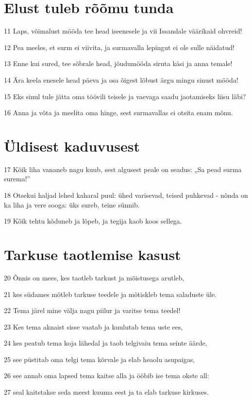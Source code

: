 \section*{Elust tuleb rõõmu tunda}

\par 11 Laps, võimalust mööda tee head iseenesele ja vii Issandale väärikaid ohvreid!
\par 12 Pea meeles, et surm ei viivita, ja surmavalla lepingut ei ole sulle näidatud!
\par 13 Enne kui sured, tee sõbrale head, jõudumööda siruta käsi ja anna temale!
\par 14 Ära keela enesele head päeva ja osa õigest lõbust ärgu mingu sinust mööda!
\par 15 Eks sinul tule jätta oma töövili teisele ja vaevaga saadu jaotamiseks liisu läbi?
\par 16 Anna ja võta ja meelita oma hinge, sest surmavallas ei otsita enam mõnu.

\section*{Üldisest kaduvusest}

\par 17 Kõik liha vananeb nagu kuub, sest algusest peale on seadus: „Sa pead surma surema!”
\par 18 Otsekui haljad lehed kaharal puul: ühed varisevad, teised puhkevad - nõnda on ka liha ja vere sooga: üks sureb, teine sünnib.
\par 19 Kõik tehtu kõduneb ja lõpeb, ja tegija kaob koos sellega.

\section*{Tarkuse taotlemise kasust}

\par 20 Õnnis on mees, kes taotleb tarkust ja mõistusega arutleb,
\par 21 kes südames mõtleb tarkuse teedele ja mõtiskleb tema saladuste üle.
\par 22 Tema järel mine välja nagu piilur ja varitse tema teedel!
\par 23 Kes tema aknaist sisse vaatab ja kuulutab tema uste ees,
\par 24 kes peatub tema koja lähedal ja taob telgivaiu tema seinte äärde,
\par 25 see püstitab oma telgi tema kõrvale ja elab heaolu asupaigas,
\par 26 see annab oma lapsed tema kaitse alla ja ööbib ise tema okste all:
\par 27 seal kaitstakse seda meest kuuma eest ja ta elab tarkuse kirkuses.

